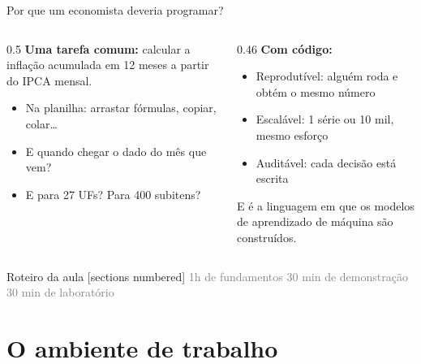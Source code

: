 \documentclass[aspectratio=169,11pt]{beamer}
\begin{document}
\maketitle

\begin{frame}{Por que um economista deveria programar?}
  \begin{columns}[T]
    \begin{column}{0.5\textwidth}
      \textbf{Uma tarefa comum:} calcular a inflação acumulada em 12 meses a
      partir do IPCA mensal.
      \begin{itemize}
        \item Na planilha: arrastar fórmulas, copiar, colar\ldots
        \item E quando chegar o dado do mês que vem?
        \item E para 27 UFs? Para 400 subitens?
      \end{itemize}
    \end{column}
    \begin{column}{0.46\textwidth}
      \textbf{Com código:}
      \begin{itemize}
        \item \alert{Reprodutível}: alguém roda e obtém o mesmo número
        \item \alert{Escalável}: 1 série ou 10 mil, mesmo esforço
        \item \alert{Auditável}: cada decisão está escrita
      \end{itemize}
      \medskip
      E é a linguagem em que os modelos de aprendizado de máquina são
      construídos.
    \end{column}
  \end{columns}
\end{frame}

\begin{frame}{Roteiro da aula}
  [sections numbered]
  \tableofcontents[hideallsubsections]
  \vfill
  \small\textcolor{gray}{1h de fundamentos \textbullet{} 30 min de demonstração \textbullet{} 30 min de laboratório}
\end{frame}

\section{O ambiente de trabalho}
\end{document}
